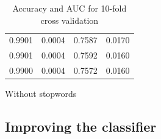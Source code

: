 \begin{table}
\begin{subtable}{.5\linewidth}
\begin{tabular}{cccc}
      0.9901          & 0.0004        & 0.7587          & 0.0170 \\
      0.9901          & 0.0004        & 0.7592          & 0.0160 \\
      0.9900          & 0.0004        & 0.7572          & 0.0160 \\ \bottomrule
    \end{tabular}
      \caption{Without stopwords}
      \label{tab:data-without-stopwords}
  \end{subtable}
\caption{Accuracy and AUC for 10-fold cross validation}
\label{tab:all-data-tables}
\end{table}



\subsection{Improving the classifier}
